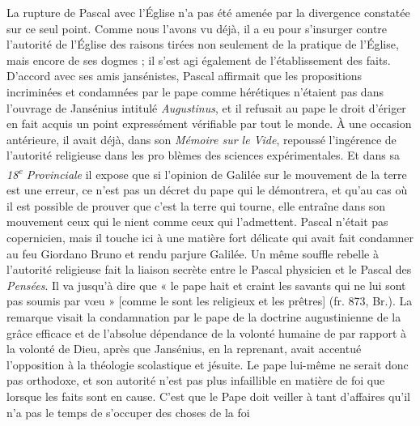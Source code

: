 \documentclass[12pt,a4paper]{article}
\begin{document}
La rupture de Pascal avec l'Église n'a pas été amenée par la divergence
constatée sur ce seul point. Comme nous l'avons vu déjà, il a
eu pour s'insurger contre l'autorité de l'Église des raisons tirées non
seulement de la pratique de l'Église, mais encore de ses dogmes ; il
s'est agi également de l'établissement des faits. D'accord avec ses
amis jansénistes, Pascal affirmait que les propositions incriminées et
condamnées par le pape comme hérétiques n'étaient pas dans l'ouvrage
de Jansénius intitulé \emph{Augustinus}, et il refusait au pape le droit
d'ériger en fait acquis un point expressément vérifiable par tout le monde.
À une occasion antérieure, il avait déjà, dans son \emph{Mémoire sur
le Vide}, repoussé l'ingérence de l'autorité religieuse dans les pro\-%
blèmes des sciences expérimentales. Et dans sa \emph{18\textsuperscript{e} Provinciale} il expose
que si l'opinion de Galilée sur le mouvement de la terre est une
erreur, ce n'est pas un décret du pape qui le démontrera, et qu'au cas
où il est possible de prouver que c'est la terre qui tourne, elle entraîne
dans son mouvement ceux qui le nient comme ceux qui l'admettent.
Pascal n'était pas copernicien, mais il touche ici à une matière fort délicate
qui avait fait condamner au feu Giordano Bruno et rendu parjure
Galilée. Un même souffle rebelle à l'autorité religieuse fait la liaison
secrète entre le Pascal physicien et le Pascal des \emph{Pensées}. Il va jusqu'à
dire que « le pape hait et craint les savants qui ne lui sont pas
soumis par vœu » [comme le sont les religieux et les prêtres] (fr. 873,
Br.). La remarque visait la condamnation par le pape de la doctrine
augustinienne de la grâce efficace et de l'absolue dépendance de la
volonté humaine de par rapport à la volonté de Dieu, après que
Jansénius, en la reprenant, avait accentué l'opposition à la théologie scolastique et jésuite. Le pape lui-même ne serait donc pas orthodoxe,
et son autorité n'est pas plus infaillible en matière de foi que
lorsque les faits sont en cause. C'est que le Pape doit veiller à tant
d'affaires qu'il n'a pas le temps de s'occuper des choses de la foi
\end{document}
